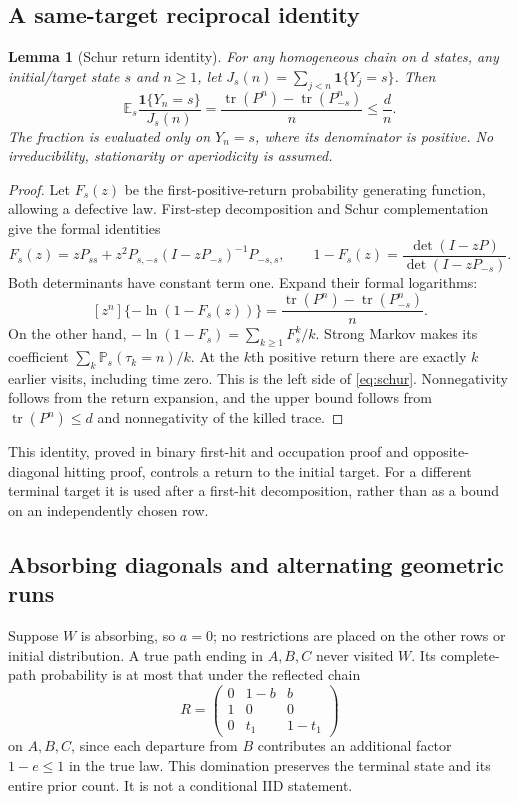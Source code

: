 \documentclass[11pt,letterpaper]{article}
\newtheorem{lemma}[theorem]{Lemma}
\theoremstyle{definition}\newtheorem{definition}[theorem]{Definition}
\theoremstyle{remark}\newtheorem{remark}[theorem]{Remark}
\newcommand{\E}{\mathbb{E}}
\newcommand{\Prob}{\mathbb{P}}
\newcommand{\ind}{\mathbf{1}}
\begin{document}
\subsection{A same-target reciprocal identity}
\begin{lemma}[Schur return identity]\label{lem:schur}
For any homogeneous chain on $d$ states, any initial/target state $s$ and $n\ge1$, let $J_s(n)=\sum_{j<n}\ind\{Y_j=s\}$. Then
\begin{equation}\label{eq:schur}
 \E_s\frac{\ind\{Y_n=s\}}{J_s(n)}
 =\frac{\operatorname{tr}(P^n)-\operatorname{tr}(P_{-s}^n)}n
 \le\frac dn .
\end{equation}
The fraction is evaluated only on $Y_n=s$, where its denominator is positive. No irreducibility, stationarity or aperiodicity is assumed.
\end{lemma}
\begin{proof}
Let $F_s(z)$ be the first-positive-return probability generating function, allowing a defective law. First-step decomposition and Schur complementation give the formal identities
\[
 F_s(z)=zP_{ss}+z^2P_{s,-s}(I-zP_{-s})^{-1}P_{-s,s},
 \qquad
 1-F_s(z)=\frac{\det(I-zP)}{\det(I-zP_{-s})}.
\]
Both determinants have constant term one. Expand their formal logarithms:
\[
 [z^n]\{-\ln(1-F_s(z))\}
 =\frac{\operatorname{tr}(P^n)-\operatorname{tr}(P_{-s}^n)}n.
\]
On the other hand, $-\ln(1-F_s)=\sum_{k\ge1}F_s^k/k$. Strong Markov makes its coefficient
$\sum_k\Prob_s(\tau_k=n)/k$. At the $k$th positive return there are exactly $k$ earlier visits, including time zero. This is the left side of \eqref{eq:schur}. Nonnegativity follows from the return expansion, and the upper bound follows from $\operatorname{tr}(P^n)\le d$ and nonnegativity of the killed trace.
\end{proof}

This identity, proved in binary first-hit and occupation proof and opposite-diagonal hitting proof, controls a return to the initial target. For a different terminal target it is used after a first-hit decomposition, rather than as a bound on an independently chosen row.

\subsection{Absorbing diagonals and alternating geometric runs}
Suppose $W$ is absorbing, so $a=0$; no restrictions are placed on the other rows or initial distribution. A true path ending in $A,B,C$ never visited $W$. Its complete-path probability is at most that under the reflected chain
\[
 R=\begin{pmatrix}0&1-b&b\\1&0&0\\0&t_1&1-t_1\end{pmatrix}
\]
on $A,B,C$, since each departure from $B$ contributes an additional factor $1-e\le1$ in the true law. This domination preserves the terminal state and its entire prior count. It is not a conditional IID statement.
\end{document}
